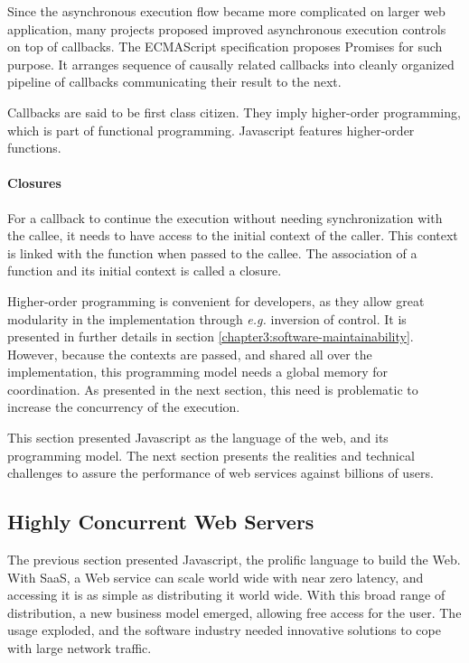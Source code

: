 Since the asynchronous execution flow became more complicated on larger web application, many projects proposed improved asynchronous execution controls on top of callbacks.
The ECMAScript specification proposes Promises for such purpose.
It arranges sequence of causally related callbacks into cleanly organized pipeline of callbacks communicating their result to the next.

Callbacks are said to be first class citizen.
They imply higher-order programming, which is part of functional programming.
Javascript features higher-order functions.

\paragraph{Closures}

For a callback to continue the execution without needing synchronization with the callee, it needs to have access to the initial context of the caller.
This context is linked with the function when passed to the callee.
The association of a function and its initial context is called a closure.

Higher-order programming is convenient for developers, as they allow great modularity in the implementation through \textit{e.g.} inversion of control.
It is presented in further details in section \ref{chapter3:software-maintainability}.
However, because the contexts are passed, and shared all over the implementation, this programming model needs a global memory for coordination.
As presented in the next section, this need is problematic to increase the concurrency of the execution.

This section presented Javascript as the language of the web, and its programming model.
The next section presents the realities and technical challenges to assure the performance of web services against billions of users.

\subsection{Highly Concurrent Web Servers}

The previous section presented Javascript, the prolific language to build the Web.
With SaaS, a Web service can scale world wide with near zero latency, and accessing it is as simple as distributing it world wide.
With this broad range of distribution, a new business model emerged, allowing free access for the user.
The usage exploded, and the software industry needed innovative solutions to cope with large network traffic.

